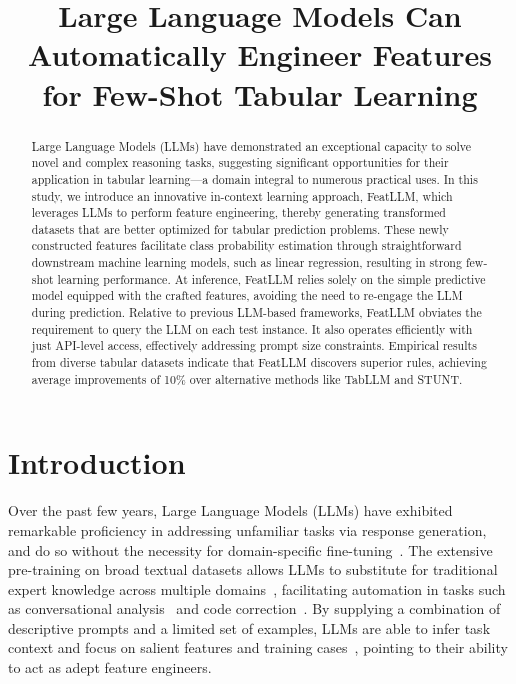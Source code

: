 \title{Large Language Models Can Automatically Engineer Features for Few-Shot Tabular Learning}

\begin{abstract}
Large Language Models (LLMs) have demonstrated an exceptional capacity to solve novel and complex reasoning tasks, suggesting significant opportunities for their application in tabular learning—a domain integral to numerous practical uses. In this study, we introduce an innovative in-context learning approach, \textsf{FeatLLM}, which leverages LLMs to perform feature engineering, thereby generating transformed datasets that are better optimized for tabular prediction problems. These newly constructed features facilitate class probability estimation through straightforward downstream machine learning models, such as linear regression, resulting in strong few-shot learning performance. At inference, \textsf{FeatLLM} relies solely on the simple predictive model equipped with the crafted features, avoiding the need to re-engage the LLM during prediction. Relative to previous LLM-based frameworks, \textsf{FeatLLM} obviates the requirement to query the LLM on each test instance. It also operates efficiently with just API-level access, effectively addressing prompt size constraints. Empirical results from diverse tabular datasets indicate that \textsf{FeatLLM} discovers superior rules, achieving average improvements of 10\% over alternative methods like TabLLM and STUNT.
\end{abstract}

\section{Introduction}
Over the past few years, Large Language Models (LLMs) have exhibited remarkable proficiency in addressing unfamiliar tasks via response generation, and do so without the necessity for domain-specific fine-tuning~\cite{creswell2022selection,imani2023mathprompter,taylor2022galactica}. The extensive pre-training on broad textual datasets allows LLMs to substitute for traditional expert knowledge across multiple domains~\cite{Genomes2021,singhal2023large,wilcox2003role}, facilitating automation in tasks such as conversational analysis~\cite{finch2023leveraging} and code correction~\cite{fan2023automated}. By supplying a combination of descriptive prompts and a limited set of examples, LLMs are able to infer task context and focus on salient features and training cases~\cite{brown2020language,zhao2023survey}, pointing to their ability to act as adept feature engineers.

